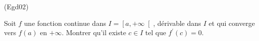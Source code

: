 \begin{tiny}(Egd02)\end{tiny}
Soit $f$ une fonction continue dans $I = \left[ a,+\infty \right[ $, d{\'e}rivable dans $I$ et qui converge vers $f(a)$ en $+\infty $.\newline
Montrer qu'il existe $c\in I$ tel que $f^{\prime }(c)=0$.